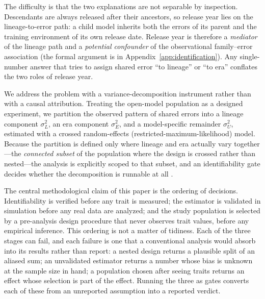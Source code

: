 \documentclass{ieeeaccess}
\theoremstyle{definition}
\theoremstyle{plain}
\begin{document}
The difficulty is that the two explanations are not separable by inspection.
Descendants are always released after their ancestors, so release year lies on
the lineage-to-error path: a child model inherits both the errors of its parent
and the training environment of its own release date. Release year is therefore a
\emph{mediator} of the lineage path and a \emph{potential confounder} of the
observational family--error association (the formal argument is in
Appendix~\ref{app:identification}). Any single-number answer that tries to assign
shared error ``to lineage'' or ``to era'' conflates the two roles of release year.

We address the problem with a variance-decomposition instrument rather than with a
causal attribution. Treating the open-model population as a designed experiment, we
partition the observed pattern of shared errors into a lineage component
$\sigma^{2}_{L}$, an era component $\sigma^{2}_{E}$, and a model-specific remainder
$\sigma^{2}_{U}$, estimated with a crossed random-effects (restricted-maximum-likelihood)
model. Because the partition is defined only where lineage and era actually vary
together---the \emph{connected subset} of the population where the design is
crossed rather than nested---the analysis is explicitly scoped to that subset, and
an identifiability gate decides whether the decomposition is runnable at all
\cite{harville1977,patterson1971}.

The central methodological claim of this paper is the ordering of decisions.
Identifiability is verified before any trait is measured; the estimator is
validated in simulation before any real data are analyzed; and the study population
is selected by a pre-analysis design procedure that never observes trait values,
before any empirical inference. This ordering is not a matter of tidiness. Each
of the three stages can fail, and each failure is one that a conventional
analysis would absorb into its results rather than report: a nested design
returns a plausible split of an aliased sum; an unvalidated estimator returns a
number whose bias is unknown at the sample size in hand; a population chosen
after seeing traits returns an effect whose selection is part of the effect.
Running the three as gates converts each of these from an unreported assumption
into a reported verdict.
\end{document}
